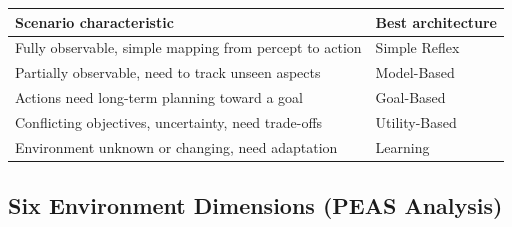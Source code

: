 \documentclass[12pt, a4paper]{article}
\begin{document}
\begin{center}
\renewcommand{\arraystretch}{1.3}
\begin{tabular}{l|l}
\toprule
\textbf{Scenario characteristic} & \textbf{Best architecture} \\
\midrule
Fully observable, simple mapping from percept to action & Simple Reflex \\
Partially observable, need to track unseen aspects & Model-Based \\
Actions need long-term planning toward a goal & Goal-Based \\
Conflicting objectives, uncertainty, need trade-offs & Utility-Based \\
Environment unknown or changing, need adaptation & Learning \\
\bottomrule
\end{tabular}
\end{center}

\subsection{Six Environment Dimensions (PEAS Analysis)}
\end{document}
